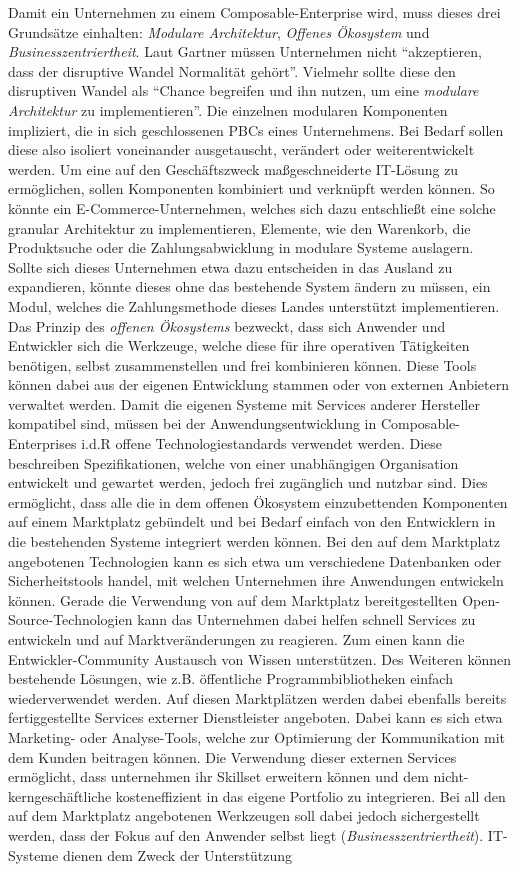 Damit ein Unternehmen zu einem Composable-Enterprise wird, muss dieses drei Grundsätze einhalten: \textit{Modulare Architektur}, \textit{Offenes Ökosystem} und \textit{Businesszentriertheit}. Laut Gartner müssen Unternehmen nicht \enquote{akzeptieren, dass der disruptive Wandel Normalität gehört}. Vielmehr sollte diese den disruptiven Wandel als \enquote{Chance begreifen und ihn nutzen, um eine \textit{modulare Architektur} zu implementieren}. Die einzelnen modularen Komponenten impliziert, die in sich geschlossenen PBCs eines Unternehmens. Bei Bedarf sollen diese also isoliert voneinander ausgetauscht, verändert oder weiterentwickelt werden. Um eine auf den Geschäftszweck maßgeschneiderte IT-Lösung zu ermöglichen, sollen Komponenten kombiniert und verknüpft werden können. So könnte ein E-Commerce-Unternehmen, welches sich dazu entschließt eine solche granular Architektur zu implementieren, Elemente, wie den Warenkorb, die Produktsuche oder die Zahlungsabwicklung in modulare Systeme auslagern. Sollte sich dieses Unternehmen etwa dazu entscheiden in das Ausland zu expandieren, könnte dieses ohne das bestehende System ändern zu müssen, ein Modul, welches die Zahlungsmethode dieses Landes unterstützt implementieren. Das Prinzip des \textit{offenen Ökosystems} bezweckt, dass sich Anwender und Entwickler sich die Werkzeuge, welche diese für ihre operativen Tätigkeiten benötigen, selbst zusammenstellen und frei kombinieren können. Diese Tools können dabei aus der eigenen Entwicklung stammen oder von externen Anbietern verwaltet werden. Damit die eigenen Systeme mit Services anderer Hersteller kompatibel sind, müssen bei der Anwendungsentwicklung in Composable-Enterprises i.d.R offene Technologiestandards verwendet werden. Diese beschreiben Spezifikationen, welche von einer unabhängigen Organisation entwickelt und gewartet werden, jedoch frei zugänglich und nutzbar sind. Dies ermöglicht, dass alle die in dem offenen Ökosystem einzubettenden Komponenten auf einem  Marktplatz gebündelt und bei Bedarf einfach von den Entwicklern in die bestehenden Systeme integriert werden können. Bei den auf dem Marktplatz angebotenen Technologien kann es sich etwa um verschiedene Datenbanken oder Sicherheitstools handel, mit welchen Unternehmen ihre Anwendungen entwickeln können. Gerade die Verwendung von auf dem Marktplatz bereitgestellten Open-Source-Technologien kann das Unternehmen dabei helfen schnell Services zu entwickeln und auf Marktveränderungen zu reagieren. Zum einen kann die Entwickler-Community Austausch von Wissen unterstützen. Des Weiteren können bestehende Lösungen, wie z.B. öffentliche Programmbibliotheken einfach wiederverwendet werden. Auf diesen Marktplätzen werden dabei ebenfalls bereits fertiggestellte Services externer Dienstleister angeboten. Dabei kann es sich etwa  Marketing- oder Analyse-Tools, welche zur Optimierung der Kommunikation mit dem Kunden beitragen können. Die Verwendung dieser externen Services ermöglicht, dass unternehmen ihr Skillset erweitern können und dem nicht-kerngeschäftliche kosteneffizient in das eigene Portfolio zu integrieren. Bei all den auf dem Marktplatz angebotenen Werkzeugen soll dabei jedoch sichergestellt werden, dass der Fokus auf den Anwender selbst liegt (\textit{Businesszentriertheit}). IT-Systeme dienen dem Zweck der Unterstützung 